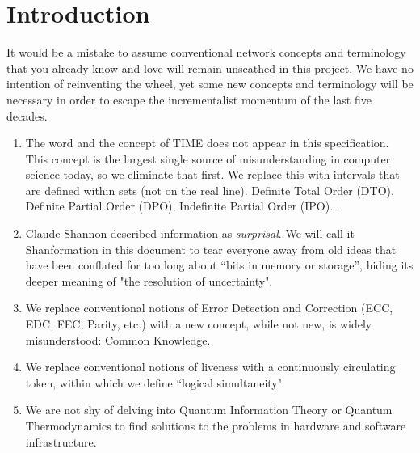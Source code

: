 \documentclass[../../../OAE-SPEC-MAIN.tex]{subfiles}
\begin{document}
\section{Introduction}

It would be a mistake to assume conventional network concepts and terminology that you already know and love will remain unscathed in this project. We have no intention of reinventing the wheel, yet some new concepts and terminology will be necessary in order to escape the incrementalist momentum of the last five decades. %


\begin{enumerate}
\item The word and the concept of TIME does not appear in this specification. This concept is the largest single source of misunderstanding in computer science today, so we  eliminate that first. 
We replace this with intervals that are defined within sets (not on the real line).  Definite Total Order (DTO), Definite Partial Order (DPO), Indefinite Partial Order (IPO). . 
\item 	 Claude Shannon described information as \emph{surprisal}.  We will call it Shanformation in this document to tear everyone away from old ideas that have been conflated for too long about ``bits in memory or storage'', hiding its deeper meaning of "the resolution of uncertainty".
\item 	We replace conventional notions of  Error Detection and Correction (ECC, EDC, FEC, Parity, etc.) with a new concept, while not new, is widely misunderstood: Common Knowledge.
\item 	We replace conventional notions of liveness with  a continuously circulating token, within which we define ``logical simultaneity"
\item		We are not shy of delving into Quantum Information Theory or Quantum Thermodynamics to find solutions to the problems in hardware and software infrastructure.
\end{enumerate}
\end{document}
